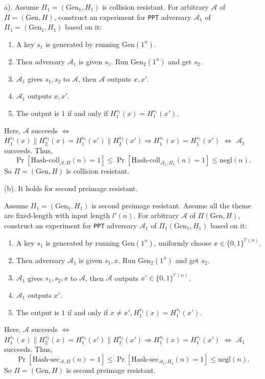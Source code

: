 \documentclass[a4paper]{article}
\newcommand{\negl}{\text{negl}}
\newcommand{\Gen}{\text{Gen}}
\newcommand{\hashsec}{\text{Hash-sec}}
\newcommand{\hashcoll}{\text{Hash-coll}}
\newcommand{\A}{\mathcal{A}}
\newenvironment{problem}[2][Problem]{\begin{trivlist}
\item[\hskip \labelsep {\bfseries #1}\hskip \labelsep {\bfseries #2.}]}{\end{trivlist}}
\begin{document}
\begin{problem}{5.2}
(a).
Assume $\Pi_1=(\Gen_1, H_1)$ is collision resistant. For arbitrary $\A$ of $\Pi=(\Gen,H)$, construct an experiment for \texttt{PPT} adversary $\A_1$ of $\Pi_1=(\Gen_1,H_1)$ based on it:\begin{enumerate}
    \item A key $s_1$ is generated by running $\Gen(1^n)$.
    \item Then adversary $\A_1$ is given $s_1$. Run $\Gen_2(1^n)$ and get $s_2$.
    \item $\A_1$ gives $s_1,s_2$ to $\A$, then $\A$ outputs $x,x'$.
    \item $\A_1$ outputs $x,x'$.
    \item The output is $1$ if and only if $H_1^{s_1}(x)=H_1^{s_1}(x')$.
\end{enumerate}
Here, $\A$ succeeds $\Leftrightarrow$ $H_1^{s_1}(x)\|H_2^{s_2}(x)=H_1^{s_1}(x')\|H_2^{s_2}(x')\Rightarrow H_1^{s_1}(x)=H_1^{s_1}(x')$ $\Leftrightarrow$ $\A_1$ succeeds. Thus,
\[\Pr[\hashcoll_{\A,\Pi}(n)=1]\le \Pr[\hashcoll_{\A_1,\Pi_1}(n)=1]\le\negl(n).\]
So $\Pi=(\Gen, H)$ is collision resistant.\par
\vspace{3ex}
(b).
It holds for second preimage resistant.\par
Assume $\Pi_1=(\Gen_1, H_1)$ is second preimage resistant. Assume all the theme are fixed-length with input length $l'(n)$. 
For arbitrary $\A$ of $\Pi(\Gen,H)$, construct an experiment for \texttt{PPT} adversary $\A_1$ of $\Pi_1(\Gen_1,H_1)$ based on it:\begin{enumerate}
    \item A key $s_1$ is generated by running $\Gen(1^n)$, uniformly choose $x\in\{0,1\}^{l'(n)}$.
    \item Then adversary $\A_1$ is given $s_1,x$. Run $\Gen_2(1^n)$ and get $s_2$.
    \item $\A_1$ gives $s_1,s_2,x$ to $\A$, then $\A$ outputs $x'\in\{0,1\}^{l'(n)}$.
    \item $\A_1$ outputs $x'$.
    \item The output is $1$ if and only if $x\ne x',H_1^{s_1}(x)=H_1^{s_1}(x')$.
\end{enumerate}
Here, $\A$ succeeds $\Leftrightarrow$ $H_1^{s_1}(x)\|H_2^{s_2}(x)=H_1^{s_1}(x')\|H_2^{s_2}(x')\Rightarrow H_1^{s_1}(x)=H_1^{s_1}(x')$ $\Leftrightarrow$ $\A_1$ succeeds. Thus,
\[\Pr[\hashsec_{\A,\Pi}(n)=1]\le \Pr[\hashsec_{\A_1,\Pi_1}(n)=1]\le\negl(n).\]
So $\Pi=(\Gen, H)$ is second preimage resistant.\par\vspace{3ex}

\end{problem}
\end{document}
